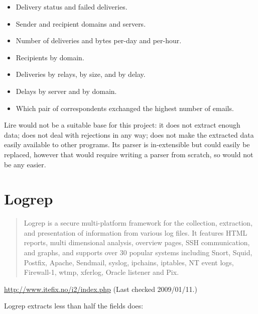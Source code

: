 \begin{itemize}

    \item Delivery status and failed deliveries.

    \item Sender and recipient domains and servers.

    \item Number of deliveries and bytes per-day and per-hour.

    \item Recipients by domain.

    \item Deliveries by relays, by size, and by delay.

    \item Delays by server and by domain.

    \item Which pair of correspondents exchanged the highest number of
        emails.

\end{itemize}

Lire would not be a suitable base for this project: it does not extract
enough data; does not deal with rejections in any way; does not make the
extracted data easily available to other programs.  Its parser is
in-extensible but could easily be replaced, however that would require
writing a parser from scratch, so would not be any easier.

\section{Logrep}

\begin{quotation}

    Logrep is a secure multi-platform framework for the collection,
    extraction, and presentation of information from various log files. It
    features HTML reports, multi dimensional analysis, overview pages, SSH
    communication, and graphs, and supports over 30 popular systems
    including Snort, Squid, Postfix, Apache, Sendmail, syslog, ipchains,
    iptables, NT event logs, Firewall-1, wtmp, xferlog, Oracle listener and
    Pix.

\end{quotation}

\noindent{}\url{http://www.itefix.no/i2/index.php} \newline{}
(Last checked 2009/01/11.)

Logrep extracts less than half the fields \parsername{} does:


